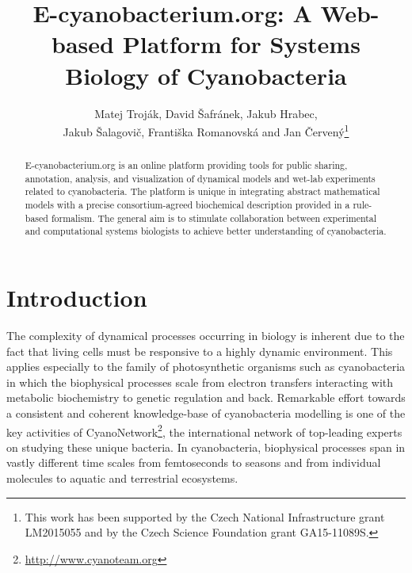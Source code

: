 \documentclass[runningheads]{llncs}
\begin{document}
\title{E-cyanobacterium.org: A Web-based Platform for Systems Biology of Cyanobacteria}
\author{Matej Troj\'{a}k, David \v{S}afr\'{a}nek, Jakub Hrabec,\\ Jakub \v{S}alagovi\v{c}, Franti\v{s}ka Romanovsk\'{a} and Jan \v{C}erven\'{y}\thanks{This work has been supported by the Czech National Infrastructure grant LM2015055 and by the Czech Science Foundation grant GA15-11089S.}}



\maketitle

\begin{abstract}
E-cyanobacterium.org is an online platform providing tools for public sharing, annotation, analysis, and visualization of dynamical models and wet-lab experiments related to cyanobacteria. The platform is unique in integrating abstract mathematical models with a precise consortium-agreed biochemical description provided in a rule-based formalism. The general aim is to stimulate collaboration between experimental and computational systems biologists to achieve better understanding of cyanobacteria.

\end{abstract}

\section{Introduction}

The complexity of dynamical processes occurring in biology is inherent due to the fact that living cells must be responsive to a highly dynamic environment. This applies especially to the family of photosynthetic organisms such as cyanobacteria in which the biophysical processes scale from electron transfers interacting with metabolic biochemistry to genetic regulation and back. Remarkable effort towards a consistent and coherent knowledge-base of cyanobacteria modelling is one of the key activities of CyanoNetwork\footnote{\url{http://www.cyanoteam.org}}, the international network of top-leading experts on studying these unique bacteria. In cyanobacteria, biophysical processes span in vastly different time scales from femtoseconds to seasons and from individual molecules to aquatic and terrestrial ecosystems.
\end{document}
